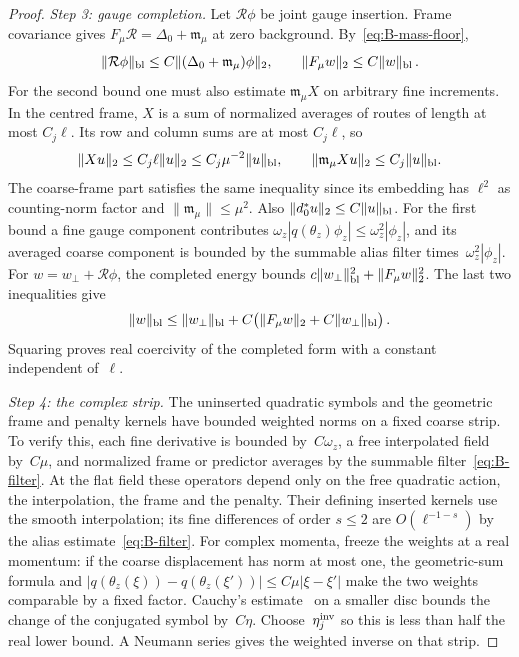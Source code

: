 \begin{proof}
\emph{Step 3: gauge completion.} Let $\mathcal R\phi$ be joint gauge insertion. Frame covariance gives $F_\mu\mathcal R=\Delta_0+\mathfrak m_\mu$ at zero background. By~\eqref{eq:B-mass-floor},
\begin{equation*}
\|\mathcal R\phi\|_{\rm bl}\le C\|(\Delta_0+\mathfrak m_\mu)\phi\|_2,\qquad
\|F_\mu w\|_2\le C\|w\|_{\rm bl}\,.
\end{equation*}
For the second bound one must also estimate $\mathfrak m_\mu X$ on arbitrary fine increments. In the centred frame, $X$ is a sum of normalized averages of routes of length at most $C_j\ell$. Its row and column sums are at most $C_j\ell$, so
\begin{equation*}
\|Xu\|_2\le C_j\ell\|u\|_2\le C_j\mu^{-2}\|u\|_{\rm bl},\qquad
\|\mathfrak m_\mu X u\|_2\le C_j\|u\|_{\rm bl}.
\end{equation*}
The coarse-frame part satisfies the same inequality since its embedding has $\ell^2$ as counting-norm factor and $\|\mathfrak m_\mu\|\le\mu^2$. Also $\|d_0^*u\|_2\le C\|u\|_{\rm bl}$. For the first bound a fine gauge component contributes $\omega_z|q(\theta_z)\phi_z|\le \omega_z^2|\phi_z|$, and its averaged coarse component is bounded by the summable alias filter times~$\omega_z^2|\phi_z|$. For $w=w_\perp+\mathcal R\phi$, the completed energy bounds $c\|w_\perp\|_{\rm bl}^2+\|F_\mu w\|_2^2$. The last two inequalities give
\begin{equation*}
\|w\|_{\rm bl}\le\|w_\perp\|_{\rm bl}+C\bigl(\|F_\mu w\|_2+C\|w_\perp\|_{\rm bl}\bigr)\,.
\end{equation*}
Squaring proves real coercivity of the completed form with a constant independent of~$\ell$.

\emph{Step 4: the complex strip.} The uninserted quadratic symbols and the geometric frame and penalty kernels have bounded weighted norms on a fixed coarse strip. To verify this, each fine derivative is bounded by~$C\omega_z$, a free interpolated field by~$C\mu$, and normalized frame or predictor averages by the summable filter~\eqref{eq:B-filter}. At the flat field these operators depend only on the free quadratic action, the interpolation, the frame and the penalty. Their defining inserted kernels use the smooth interpolation; its fine differences of order $s\le2$ are $O(\ell^{-1-s})$ by the alias estimate~\eqref{eq:B-filter}. For complex momenta, freeze the weights at a real momentum: if the coarse displacement has norm at most one, the geometric-sum formula and $|q(\theta_z(\xi))-q(\theta_z(\xi'))|\le C\mu|\xi-\xi'|$ make the two weights comparable by a fixed factor. Cauchy's estimate~\cite[Proposition~1.2.2]{Lebl2026} on a smaller disc bounds the change of the conjugated symbol by~$C\eta$. Choose~$\eta_j^{\rm inv}$ so this is less than half the real lower bound. A Neumann series gives the weighted inverse on that strip.


\end{proof}
